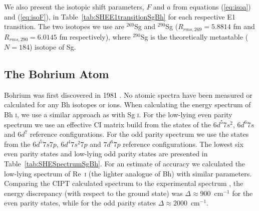 \documentclass[10pt,a4paper, twoside, openright]{report}
\begin{document}
We also present the isotopic shift parameters, $F$ and $a$ from equations (\ref{eq:isoa}) and (\ref{eq:isoF}), in Table~\ref{tab:SHEE1transitionSgBh} for each respective E1 transition. The two isotopes we use are $^{269}$Sg  and $^{290}$Sg ($R_{rms,\text{269}} = 5.8814$ fm and $R_{rms,\text{290}}  = 6.0145$ fm respectively),  where $^{290}$Sg is the theoretically  metastable ($N=184$) isotope of Sg. 

\subsection{The Bohrium Atom}  \label{sec:Bh}

 Bohrium was first discovered in 1981 \cite{Munzenberg1981}. No atomic spectra have been measured or calculated for any Bh isotopes or ions. When calculating the energy spectrum of Bh \textsc{i}, we use a similar approach as with Sg \textsc{i}.  For the low-lying even parity spectrum we use an effective CI matrix build from the states of the $6d^5 7s^2$, $6d^6 7s$ and $6d^7$ reference configurations. For the odd parity spectrum we use the states from the $6d^5 7s 7p$, $6d^4 7s^2 7p$ and $7d^6 7p$ reference configurations. The lowest six even parity states and low-lying odd parity states are presented in Table~\ref{tab:SHESpectrumSgBh}. For an estimate of accuracy we calculated the low-lying spectrum of Re~\textsc{i} (the lighter analogue of Bh) with similar parameters. Comparing the CIPT calculated spectrum to the experimental spectrum \cite{NIST_ASD}, the energy discrepancy (with respect to the ground state) was $\Delta \approx 900$~cm$^{-1}$ for the even parity states, while for the odd parity states $\Delta \approx 2000$~cm$^{-1}$.\\
\linebreak
\end{document}
